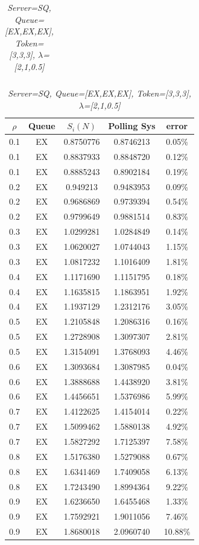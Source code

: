 \documentclass[12pt,a4paper,italian]{article}
\begin{document}
\begin{table}[hb!]
\begin{minipage}[b]{0.48\linewidth}
\begin{tabular}{c c c c c}
		
	\end{tabular}
	\end{minipage}
	\hspace{0.5cm}
	\begin{minipage}[b]{0.48\linewidth}
		\centering
			\caption{\scriptsize \emph{Server=SQ, Queue=[EX,EX,EX], Token=[3,3,3], $\lambda$=[2,1,0.5]}}
			\label{tab2}
		\tiny
		\begin{tabular}{c c c c c}
			\hline
			$\rho$ & Queue & $S_i(N)$ & Polling Sys & error \\ \hline
		 0.1 & EX & 0.8750776 &   0.8746213    & 0.05\%  \\
		  0.1 & EX & 0.8837933 &   0.8848720    & 0.12\%  \\
		  0.1 & EX & 0.8885243 &   0.8902184    & 0.19\%  \\ \hline \hline
		  0.2 & EX & 0.949213 &   0.9483953    & 0.09\% \\
		  0.2 & EX & 0.9686869 &   0.9739394    & 0.54\% \\
		  0.2 & EX & 0.9799649 &   0.9881514    & 0.83\% \\ \hline \hline
		  0.3 & EX & 1.0299281 &   1.0284849    & 0.14\% \\
		  0.3 & EX & 1.0620027 &   1.0744043    & 1.15\% \\
		  0.3 & EX & 1.0817232 &   1.1016409    & 1.81\% \\ \hline \hline
		  0.4 & EX & 1.1171690 &   1.1151795    & 0.18\% \\
		  0.4 & EX & 1.1635815 &   1.1863951    & 1.92\% \\
		  0.4 & EX & 1.1937129 &   1.2312176    & 3.05\% \\ \hline \hline
		  0.5 & EX & 1.2105848 &   1.2086316    & 0.16\% \\
		  0.5 & EX & 1.2728908 &   1.3097307    & 2.81\% \\
		  0.5 & EX & 1.3154091 &   1.3768093    & 4.46\% \\ \hline \hline
		  0.6 & EX & 1.3093684 &   1.3087985    & 0.04\% \\
		  0.6 & EX & 1.3888688 &   1.4438920    & 3.81\% \\
		  0.6 & EX & 1.4456651 &   1.5376986    & 5.99\% \\ \hline \hline
		  0.7 & EX & 1.4122625 &   1.4154014    & 0.22\% \\
		  0.7 & EX & 1.5099462 &   1.5880138    & 4.92\% \\
		  0.7 & EX & 1.5827292 &   1.7125397    & 7.58\% \\ \hline \hline
		  0.8 & EX & 1.5176380 &   1.5279088    & 0.67\% \\
		  0.8 & EX & 1.6341469 &   1.7409058    & 6.13\% \\
		  0.8 & EX & 1.7243490 &   1.8994364    & 9.22\% \\ \hline \hline
		  0.9 & EX & 1.6236650 &   1.6455468    & 1.33\% \\
		  0.9 & EX & 1.7592921 &   1.9011056    & 7.46\% \\
		  0.9 & EX & 1.8680018 &   2.0960740    & 10.88\% \\ \hline 
		 

\end{tabular}
\end{minipage}
\end{table}
\end{document}
